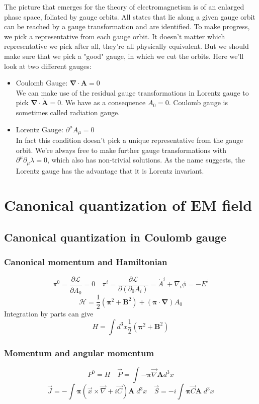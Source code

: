 The picture that emerges for the theory of electromagnetism is of an enlarged phase space, foliated by gauge orbits. All states that lie along a given gauge orbit can be reached by a gauge transformation and are identified. To make progress, we pick a representative from each gauge orbit. It doesn't matter which representative we pick after all, they're all physically equivalent. But we should make sure that we pick a "good" gauge, in which we cut the orbits. Here we'll look at two different gauges:
\begin{itemize}
\item Coulomb Gauge: $\bm{\nabla} \cdot \bm{A} = 0$\\
We can make use of the residual gauge transformations in Lorentz gauge to pick $\bm{\nabla} \cdot \dot{\bm{A}} = 0$. We
have as a consequence $A_0 = 0$. Coulomb gauge is sometimes called radiation gauge.
\item Lorentz Gauge: $\partial^{\mu} A_{\mu} = 0$\\
In fact this condition doesn't pick a unique representative from the gauge orbit. We're always free to make further gauge transformations with $\partial^{\mu}\partial_{\mu} \lambda = 0$, which also has non-trivial solutions. As the name suggests, the Lorentz gauge has the advantage that it is Lorentz invariant.
\end{itemize}

\section{Canonical quantization of EM field}
\subsection{Canonical quantization in Coulomb gauge}

\subsubsection{Canonical momentum and Hamiltonian}
\[\pi^0 = \frac{\partial \mathcal{L}}{\partial \dot{A_0}} = 0 \quad  \pi^{i} = \frac{\partial \mathcal{L}}{\partial(\partial_0 A_i)} = \dot{A}^i + \nabla_i \phi = -E^i\]
\[\mathcal{H} = \frac{1}{2}(\bm{\pi}^2 + \bm{B}^2) + (\bm{\pi} \cdot \bm{\nabla}) A_0\]
Integration by parts can give
\[H = \int d^3x \frac{1}{2}(\bm{\pi}^2 + \bm{B}^2)\]

\subsubsection{Momentum and angular momentum}
\[P^0 = H \quad \vec{P} = \int - \bm{\pi} \vec{\nabla} \bm{A} d^3x\]
\[\vec{J} = - \int \bm{\pi} (\vec{x}\times \vec{\nabla} + i \vec{C})\bm{A} \; d^3x \quad \vec{S} = -i \int \bm{\pi} \vec{C} \bm{A} \; d^3x\]

